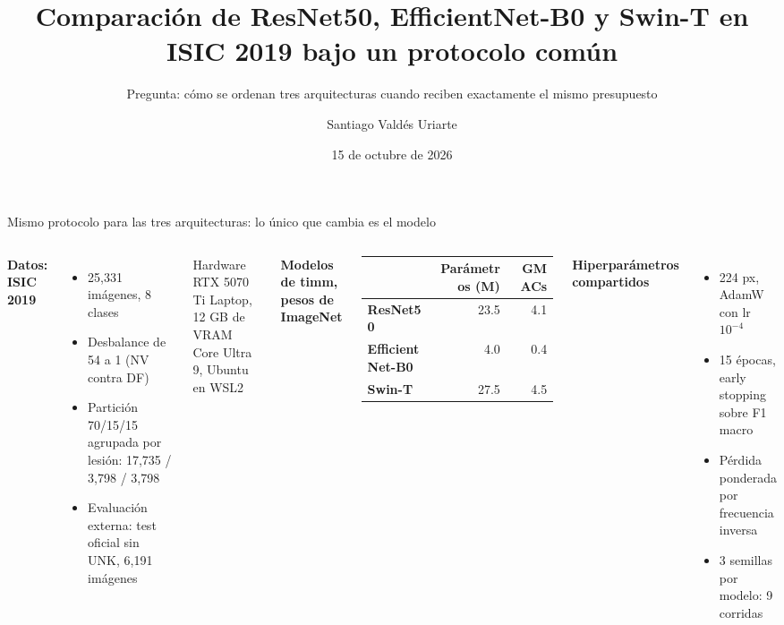 \documentclass[aspectratio=169,11pt]{beamer}
\title{Comparación de ResNet50, EfficientNet-B0 y Swin-T en ISIC 2019 bajo un protocolo común}
\subtitle{Pregunta: cómo se ordenan tres arquitecturas cuando reciben exactamente el mismo presupuesto}
\author{Santiago Valdés Uriarte}
\institute{Maestría en Inteligencia Artificial y Ciencia de Datos, Universidad Panamericana\\Aprendizaje Profundo, proyecto final}
\date{15 de octubre de 2026}
\newcommand{\R}{\textcolor{resnet}{\textbf{ResNet50}}}
\newcommand{\E}{\textcolor{effnet}{\textbf{EfficientNet-B0}}}
\newcommand{\Sw}{\textcolor{swin}{\textbf{Swin-T}}}
\begin{document}
\begin{frame}[plain]
\titlepage
\end{frame}

\begin{frame}{Mismo protocolo para las tres arquitecturas: lo único que cambia es el modelo}
\small
\begin{columns}[T,onlytextwidth]
\textbf{Datos: ISIC 2019}
\begin{itemize}
\item 25,331 imágenes, 8 clases
\item Desbalance de 54 a 1 (NV contra DF)
\item Partición 70/15/15 agrupada por lesión: 17,735 / 3,798 / 3,798
\item Evaluación externa: test oficial sin UNK, 6,191 imágenes
\end{itemize}
\vspace{6pt}
\begin{block}{Hardware}
RTX 5070 Ti Laptop, 12 GB de VRAM\\
Core Ultra 9, Ubuntu en WSL2
\end{block}
\textbf{Modelos de timm, pesos de ImageNet}\par\vspace{2pt}
\begin{tabular}{lrr}
\toprule
 & Parámetros (M) & GMACs \\
\midrule
\R & 23.5 & 4.1 \\
\E & 4.0 & 0.4 \\
\Sw & 27.5 & 4.5 \\
\bottomrule
\end{tabular}
\par\vspace{6pt}
\textbf{Hiperparámetros compartidos}
\begin{itemize}
\item 224 px, AdamW con lr $10^{-4}$
\item 15 épocas, early stopping sobre F1 macro
\item Pérdida ponderada por frecuencia inversa
\item 3 semillas por modelo: 9 corridas
\end{itemize}
\end{columns}
\end{frame}
\end{document}
